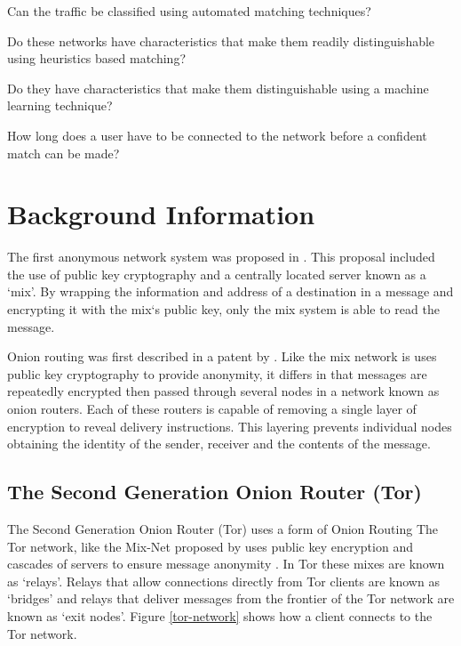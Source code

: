 \documentclass{conference}
\begin{document}
\begin{enumerate*}
\item Can the traffic be classified using automated matching techniques?
\item Do these networks have characteristics that make them readily distinguishable using heuristics based matching?
\item Do they have characteristics that make them distinguishable using a machine learning technique?
\item How long does a user have to be connected to the network before a confident match can be made?
\end{enumerate*}

\section{Background Information}

The first anonymous network system was proposed in \textcite{Chaum:1981p296}. This proposal included the use of public key cryptography and a centrally located server known as a `mix'. By wrapping the information and address of a destination in a message and encrypting it with the mix`s public key, only the mix system is able to read the message.

Onion routing was first described in a patent by \cite{Michael:2001}. Like the mix network is uses public key cryptography to provide anonymity, it differs in that messages are repeatedly encrypted then passed through several nodes in a network known as onion routers. Each of these routers is capable of removing a single layer of encryption to reveal delivery instructions. This layering prevents individual nodes obtaining the identity of the sender, receiver and the contents of the message.

\subsection{The Second Generation Onion Router (Tor)}

The Second Generation Onion Router (Tor) uses a form of Onion Routing 
The Tor network, like the Mix-Net proposed by \textcite{Chaum:1981p296} uses public key encryption and cascades of servers to ensure message anonymity \parencite{Dingledine:2004p314}. In Tor these mixes are known as ‘relays’. Relays that allow connections directly from Tor clients are known as ‘bridges’ and relays that deliver messages from the frontier of the Tor network are known as ‘exit nodes’. Figure \ref{tor-network} shows how a client connects to the Tor network.
\end{document}
